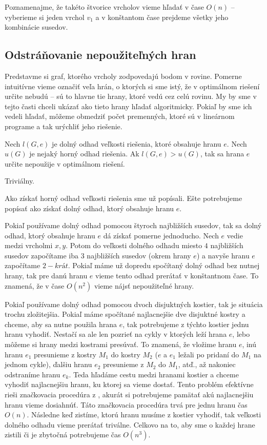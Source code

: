 Poznamenajme, že takéto štvorice vrcholov vieme hľadať v čase $O(n)$ -- vyberieme si jeden vrchol
$v_1$ a v konštantom čase prejdeme všetky jeho kombinácie susedov.

\subsection{Odstráňovanie nepoužiteľných hran}

Predstavme si graf, ktorého vrcholy zodpovedajú bodom v rovine. Pomerne intuitívne vieme označiť
veľa hrán, o ktorých si sme istý, že v optimálnom riešení určite nebudú -- sú to hlavne tie hrany,
ktoré vedú cez celú rovinu. My by sme v tejto časti chceli ukázať ako tieto hrany
hľadať algoritmicky. Pokiaľ by sme ich vedeli hľadať, môžeme obmedziť počet premenných, ktoré
sú v lineárnom programe a tak urýchliť jeho riešenie.

\begin{lema}
Nech $l(G, e)$ je dolný odhad veľkosti riešenia, ktoré obsahuje hranu $e$.
Nech $u(G)$ je nejaký horný odhad riešenia. Ak $l(G, e) > u(G)$, tak sa hrana $e$ určite nepoužije v
optimálnom riešení.
\end{lema}

\begin{dokaz}
Triviálny.
\end{dokaz}

Ako získať horný odhad veľkosti riešenia sme už popísali. Ešte potrebujeme popísať ako získať dolný
odhad, ktorý obsahuje hranu $e$.

\medskip
Pokiaľ používame dolný odhad pomocou štyroch najbližších susedov, tak sa dolný odhad, ktorý obsahuje
hranu $e$ dá získať pomerne jednoducho. Nech $e$ vedie medzi vrcholmi $x, y$. Potom do veľkosti
dolného odhadu miesto $4$ najbližších susedov započítame iba $3$ najbližších susedov (okrem hrany
$e$) a navyše hranu $e$ započítame $2-krát$. Pokiaľ máme už dopredu spočítaný dolný odhad bez nutnej
hrany, tak pre danú hranu $e$ vieme tento odhad prerátať v konštantnom čase. 
To znamená, že v čase $O(n^2)$ vieme nájsť nepoužiteľné hrany. 

\medskip
Pokiaľ používame dolný odhad pomocou dvoch disjuktných kostier, tak je situácia trochu zložitejšia.
Pokiaľ máme spočítané najlacnejšie dve disjuktné kostry a chceme, aby sa nutne použila hrana $e$,
tak potrebujeme z týchto kostier jednu hranu vyhodiť. Nestačí sa ale len pozrieť na cykly v ktorých
leží hrana $e$, lebo môžeme si hrany medzi kostrami presúvať. To znamená, že vložime hranu $e$, inú
hranu $e_1$ presunieme z kostry $M_1$ do kostry $M_2$ ($e$ a $e_1$ ležali po pridaní do $M_1$ na
jednom cykle), ďalšiu hranu $e_2$ presunieme z $M_2$ do $M_1$, atď., až nakoniec odstraníme hranu
$e_k$. Teda hľadáme cestu medzi hranami kostier a chceme vyhodiť najlacnejšiu hranu, ku ktorej sa
vieme dostať. Tento problém efektívne rieši značkovacia procedúra z \cite{spanning2}, akurát si
potrebujeme pamätať akú najlacnejšiu hranu vieme dosiahnúť. Táto značkovacia procedúra trvá pre
jednu hranu čas $O(n)$. Následne keď zistíme, ktorú hranu musíme z kostier vyhodiť, tak
veľkosti dolného odhadu vieme prerátať triválne. Celkovo na to, aby sme o každej hrane zistili či
je zbytočná potrebujeme čas $O(n^3)$. 

